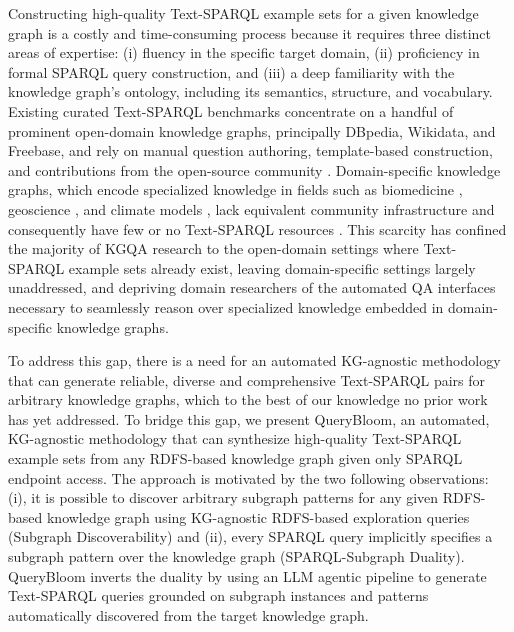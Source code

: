 Constructing high-quality Text-SPARQL example sets for a given knowledge graph is a costly and time-consuming process because it requires three distinct areas of expertise: (i) fluency in the specific target domain, (ii) proficiency in formal SPARQL query construction, and (iii) a deep familiarity with the knowledge graph's ontology, including its semantics, structure, and vocabulary. Existing curated Text-SPARQL benchmarks concentrate on a handful of prominent open-domain knowledge graphs, principally DBpedia, Wikidata, and Freebase, and rely on manual question authoring, template-based construction, and contributions from the open-source community \cite{usbeck2019qald,usbeck2021qald,trivedi2017lc,dubey2019lcquad,wikisp2023,liu2024spinach}. Domain-specific knowledge graphs, which encode specialized knowledge in fields such as biomedicine \cite{kgs2025biomedical}, geoscience \cite{sockg2025}, and climate models \cite{adamu2025climatepub4kg}, lack equivalent community infrastructure and consequently have few or no Text-SPARQL resources \cite{frink_proto-okn}. This scarcity has confined the majority of KGQA research \cite{liu2024spinach,zahera2024generating,sgpt2022generative,kacupaj2023sparqlgen,banerjee2022modern,diallo2025frase,sun2022think,wikisp2023} to the open-domain settings where Text-SPARQL example sets already exist, leaving domain-specific settings largely unaddressed, and depriving domain researchers of the automated QA interfaces necessary to seamlessly reason over specialized knowledge embedded in domain-specific knowledge graphs.

To address this gap, there is a need for an automated KG-agnostic methodology that can generate reliable, diverse and comprehensive Text-SPARQL pairs for arbitrary knowledge graphs, which to the best of our knowledge no prior work has yet addressed. To bridge this gap, we present QueryBloom, an automated, KG-agnostic methodology that can synthesize high-quality Text-SPARQL example sets from any RDFS-based knowledge graph given only SPARQL endpoint access. The approach is motivated by the two following observations: (i), it is possible to discover arbitrary subgraph patterns for any given RDFS-based knowledge graph using KG-agnostic RDFS-based exploration queries (Subgraph Discoverability) and (ii), every SPARQL query implicitly specifies a subgraph pattern over the knowledge graph (SPARQL-Subgraph Duality). QueryBloom inverts the duality by using an LLM agentic pipeline to generate Text-SPARQL queries grounded on subgraph instances and patterns automatically discovered from the target knowledge graph.

